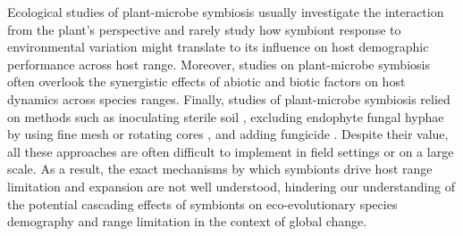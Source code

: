 \documentclass[11pt]{article}
\begin{document}
Ecological studies of plant-microbe symbiosis usually  investigate the interaction from the plant’s perspective and rarely  study how symbiont response to environmental variation might translate to its influence on host demographic performance across host range.
Moreover, studies on plant-microbe symbiosis often overlook the synergistic effects of abiotic and biotic factors on host dynamics across species ranges.
Finally, studies of plant-microbe symbiosis relied on  methods  such as inoculating sterile soil \citep{peacher2020inoculum}, excluding endophyte fungal hyphae by using fine mesh or rotating cores \citep{chung2019connecting}, and adding fungicide \citep{bennett2022costs}. 
Despite their value, all these approaches are often difficult to implement in field settings or on a large scale.
As a result, the exact mechanisms by which symbionts drive host range limitation and expansion are not well understood, hindering our understanding of the potential cascading effects of symbionts on eco-evolutionary species demography and  range limitation in the context of global change.

\end{document}

